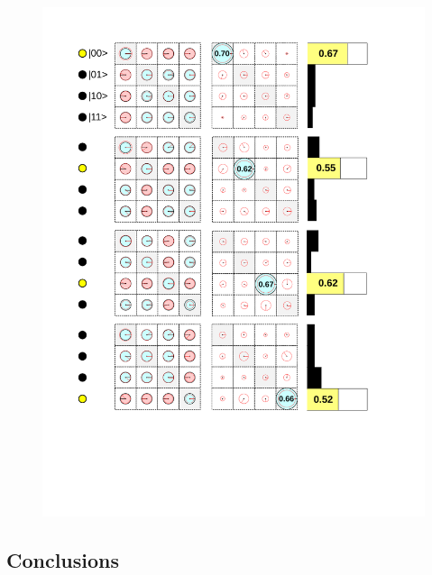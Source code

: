 
\begin{figure}
	\centering
		\includegraphics[width=1.\textwidth]{./material/papers/grover/figures/grover_algorithm_experimental_results}
	\label{fig:GroverAlgorithmExperimentalResults}
	\caption{}
\end{figure}

\subsection{Conclusions}

